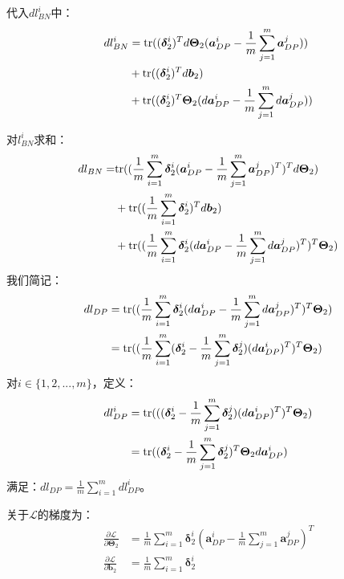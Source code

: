 \documentclass[12pt, a4paper]{article}
\newcommand{\imat}{\bm}
\newcommand{\ivec}{\bm}
\newcommand{\tr}{{\rm tr}}
\newcommand{\loss}{\mathcal{L}}
\newcommand{\thetam}{\imat{\Theta}}
\newcommand{\deltav}{\ivec{\delta}}
\newcommand{\av}{\ivec{a}}
\newcommand{\bv}{\ivec{b}}
\begin{document}
\begin{enumerate}
            代入$d l_{BN}^i$中：
            \begin{align*}
            d l_{BN}^i &= \tr((\deltav_2^i)^T d \thetam_2 (\av_{DP}^i - \frac{1}{m} \sum_{j=1}^{m} \av_{DP}^j)) \\
                        &+ \tr((\deltav_2^i)^T d \bv_2) \\
                        &+ \tr((\deltav_2^i)^T \thetam_2 (d \av_{DP}^i - \frac{1}{m} \sum_{j=1}^{m} d \av_{DP}^j))
            \end{align*}

            对$l_{BN}^i$求和：
            \begin{align*}
            d l_{BN} = &\tr((\frac{1}{m} \sum_{i = 1}^{m} \deltav_2^i (\av_{DP}^i - \frac{1}{m} \sum_{j=1}^{m} \av_{DP}^j)^T)^T d \thetam_2) \\
                        &+ \tr((\frac{1}{m} \sum_{i = 1}^{m} \deltav_2^i)^T d \bv_2) \\
                        &+ \tr((\frac{1}{m} \sum_{i = 1}^{m} \deltav_2^i (d \av_{DP}^i - \frac{1}{m} \sum_{j=1}^{m} d \av_{DP}^j)^T)^T \thetam_2)
            \end{align*}
            我们简记：
            \begin{align*}
            d l_{DP}
            &= \tr((\frac{1}{m} \sum_{i = 1}^{m} \deltav_2^i (d \av_{DP}^i - \frac{1}{m} \sum_{j=1}^{m} d \av_{DP}^j)^T)^T \thetam_2) \\
            &= \tr((\frac{1}{m} \sum_{i = 1}^{m} (\deltav_2^i - \frac{1}{m} \sum_{j = 1}^{m} \deltav_2^j) (d \av_{DP}^i)^T)^T \thetam_2)
            \end{align*}
            对$i \in \{1, 2, ..., m\}$，定义：
            \begin{align*}
            d l_{DP}^i
            &= \tr(((\deltav_2^i - \frac{1}{m} \sum_{j = 1}^{m} \deltav_2^j) (d \av_{DP}^i)^T)^T \thetam_2) \\
            &= \tr((\deltav_2^i - \frac{1}{m} \sum_{j = 1}^{m} \deltav_2^j)^T \thetam_2 d \av_{DP}^i)
            \end{align*}
            满足：$d l_{DP} = \frac{1}{m} \sum_{i = 1}^{m} d l_{DP}^i$。

            关于$\loss$的梯度为：
            \begin{align}
            \frac{\partial \loss}{\partial \thetam_2} &= \frac{1}{m} \sum_{i = 1}^{m} \deltav_2^i (\av_{DP}^i - \frac{1}{m} \sum_{j=1}^{m} \av_{DP}^j)^T \\
            \frac{\partial \loss}{\partial \bv_2} &= \frac{1}{m} \sum_{i = 1}^{m} \deltav_2^i
            \end{align}


\end{enumerate}
\end{document}

